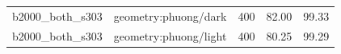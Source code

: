 \begin{longtable}{l>{\raggedright\arraybackslash}p{.42\linewidth}rrr}
b2000\_\allowbreak{}both\_\allowbreak{}s303 & %
geometry:phuong/dark & %
400 & %
82.00 & %
99.33 \\ %

b2000\_\allowbreak{}both\_\allowbreak{}s303 & %
geometry:phuong/light & %
400 & %
80.25 & %
99.29 \\ %


\end{longtable}
